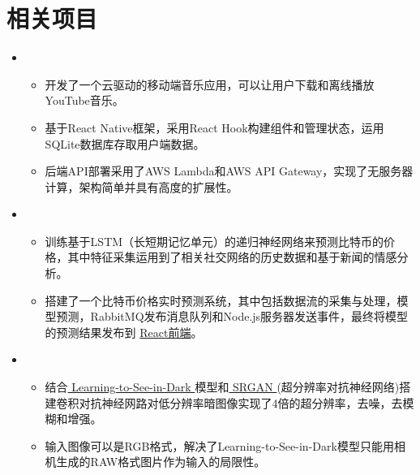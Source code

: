 \documentclass[11pt,a4paper,sans]{moderncv}        %
\begin{document}
\section{相关项目}
\vspace{2pt}
\begin{itemize}

\item{

\begin{itemize}
\item{开发了一个云驱动的移动端音乐应用，可以让用户下载和离线播放YouTube音乐。}
\vspace{2pt}
\item{基于React Native框架，采用React Hook构建组件和管理状态，运用SQLite数据库存取用户端数据。}
\vspace{2pt}
\item{后端API部署采用了AWS Lambda和AWS API Gateway，实现了无服务器计算，架构简单并具有高度的扩展性。}
\end{itemize}}

\vspace{1em}

\item{

\begin{itemize}
\item{训练基于LSTM（长短期记忆单元）的递归神经网络来预测比特币的价格，其中特征采集运用到了相关社交网络的历史数据和基于新闻的情感分析。}
\vspace{2pt}
\item{搭建了一个比特币价格实时预测系统，其中包括数据流的采集与处理，模型预测，RabbitMQ发布消息队列和Node.js服务器发送事件，最终将模型的预测结果发布到 \textcolor{cyan}{\href{http://crypto-host.s3-website-us-west-2.amazonaws.com}{React前端}}。}
\end{itemize}}

\vspace{1em}
\item{

\begin{itemize}
\item{结合\textcolor{cyan}{\href{https://arxiv.org/abs/1805.01934}{ Learning-to-See-in-Dark }}模型和\textcolor{cyan}{\href{https://arxiv.org/abs/1609.04802}{ SRGAN }}(超分辨率对抗神经网络)搭建卷积对抗神经网路对低分辨率暗图像实现了4倍的超分辨率，去噪，去模糊和增强。}
\vspace{2pt}
\item{输入图像可以是RGB格式，解决了Learning-to-See-in-Dark模型只能用相机生成的RAW格式图片作为输入的局限性。}
\end{itemize}}

\end{itemize}
\end{document}
